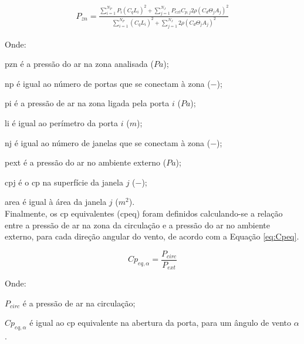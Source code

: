 \documentclass[brazil,hardcopy,openany]{ufscthesis} %
\begin{document}
\begin{equation}\label{eq:P}
\begin{split}
P_{zn} = \frac{\sum_{i=1}^{N_P}{P_{i} (C_q L_i)^2} +  %
	\sum_{j=1}^{N_J}{P_{ext} C_{p,j} 2 \rho (C_{d} \Theta_j A_j)^2 }}
{\sum_{i=1}^{N_P}{(C_q L_i)^2} +  %
	\sum_{j=1}^{N_J}{2 \rho (C_{d} \Theta_j A_j)^2 }}
\end{split}
\end{equation}

Onde:

\gls{pzn} é a pressão do ar na zona analisada ($Pa$);

\gls{np} é igual ao número de portas que se conectam à zona ($-$);

\gls{pi} é a pressão de ar na zona ligada pela porta $i$ ($Pa$);

\gls{li} é igual ao perímetro da porta $i$ ($m$);

\gls{nj} é igual ao número de janelas que se conectam à zona ($-$);

\gls{pext} é a pressão do ar no ambiente externo ($Pa$);

\gls{cpj} é o \acrshort{cp} na superfície da janela $j$ ($-$);

\gls{area} é igual à área da janela $j$ ($m^2$).
\\

Finalmente, os \acrshort{cp} equivalentes (\acrshort{cpeq}) foram definidos calculando-se a relação entre a pressão de ar na zona da circulação e a pressão do ar no ambiente externo, para cada direção angular do vento, de acordo com a Equação \ref{eq:Cpeq}.

\begin{equation}\label{eq:Cpeq}
Cp_{eq,\alpha} = \frac{P_{circ}}{P_{ext}}
\end{equation}

Onde:

$P_{circ}$ é a pressão de ar na circulação;

$Cp_{eq,\alpha}$ é igual ao \acrshort{cp} equivalente na abertura da porta, para um ângulo de vento $\alpha$.
\\
\end{document}
